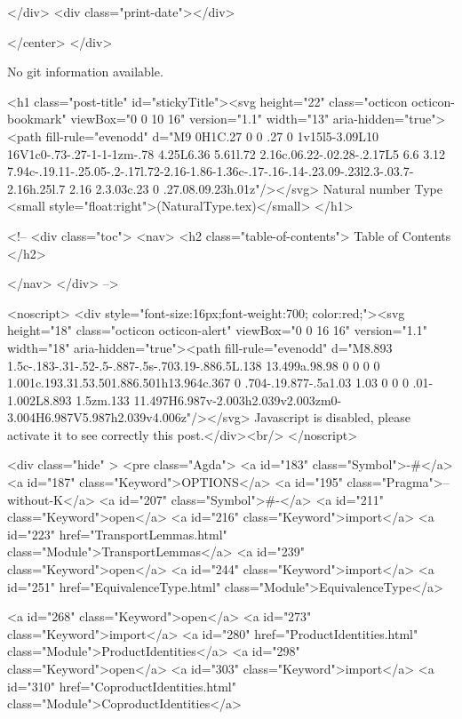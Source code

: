           
        </div>
        <div class="print-date"></div>
        
        
    </center>
  </div>

  
  No git information available.
  

  <h1 class="post-title" id="stickyTitle"><svg height="22" class="octicon octicon-bookmark" viewBox="0 0 10 16" version="1.1" width="13" aria-hidden="true"><path fill-rule="evenodd" d="M9 0H1C.27 0 0 .27 0 1v15l5-3.09L10 16V1c0-.73-.27-1-1-1zm-.78 4.25L6.36 5.61l.72 2.16c.06.22-.02.28-.2.17L5 6.6 3.12 7.94c-.19.11-.25.05-.2-.17l.72-2.16-1.86-1.36c-.17-.16-.14-.23.09-.23l2.3-.03.7-2.16h.25l.7 2.16 2.3.03c.23 0 .27.08.09.23h.01z"/></svg> Natural number Type <small style="float:right">(NaturalType.tex)</small>
  </h1>

  <!-- 
  <div class="toc">
    <nav>
    <h2 class="table-of-contents"> Table of Contents </h2>
      

    </nav>
  </div>
   -->

  <noscript>
  <div style="font-size:16px;font-weight:700; color:red;"><svg height="18" class="octicon octicon-alert" viewBox="0 0 16 16" version="1.1" width="18" aria-hidden="true"><path fill-rule="evenodd" d="M8.893 1.5c-.183-.31-.52-.5-.887-.5s-.703.19-.886.5L.138 13.499a.98.98 0 0 0 0 1.001c.193.31.53.501.886.501h13.964c.367 0 .704-.19.877-.5a1.03 1.03 0 0 0 .01-1.002L8.893 1.5zm.133 11.497H6.987v-2.003h2.039v2.003zm0-3.004H6.987V5.987h2.039v4.006z"/></svg> Javascript is disabled, please activate it to see correctly this post.</div><br/>
  </noscript>

  <div class="hide" >
<pre class="Agda">
<a id="183" class="Symbol">{-#</a> <a id="187" class="Keyword">OPTIONS</a> <a id="195" class="Pragma">--without-K</a> <a id="207" class="Symbol">#-}</a>
<a id="211" class="Keyword">open</a> <a id="216" class="Keyword">import</a> <a id="223" href="TransportLemmas.html" class="Module">TransportLemmas</a>
<a id="239" class="Keyword">open</a> <a id="244" class="Keyword">import</a> <a id="251" href="EquivalenceType.html" class="Module">EquivalenceType</a>

<a id="268" class="Keyword">open</a> <a id="273" class="Keyword">import</a> <a id="280" href="ProductIdentities.html" class="Module">ProductIdentities</a>
<a id="298" class="Keyword">open</a> <a id="303" class="Keyword">import</a> <a id="310" href="CoproductIdentities.html" class="Module">CoproductIdentities</a>

